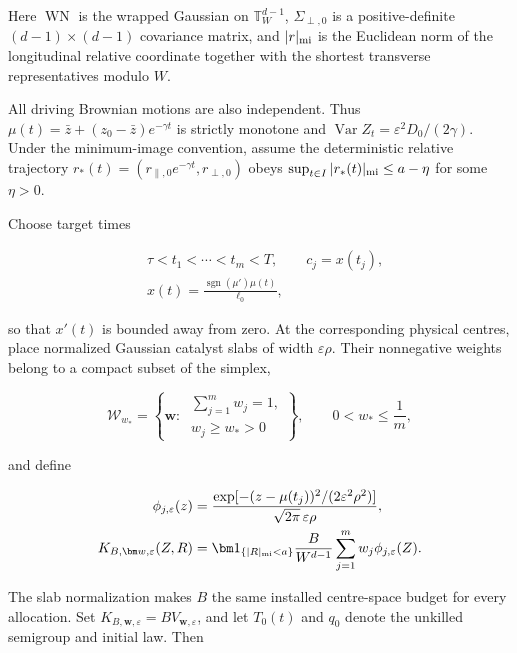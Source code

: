 Here $\operatorname{WN}$ is the wrapped Gaussian on
$\mathbb T_W^{d-1}$, $\Sigma_{\perp,0}$ is a positive-definite
$(d-1)\times(d-1)$ covariance matrix, and $|r|_{\rm mi}$ is the Euclidean norm
of the longitudinal relative coordinate together with the shortest transverse
representatives modulo $W$.

All driving Brownian motions are also independent.  Thus
$\mu(t)=\bar z+(z_0-\bar z)e^{-\gamma t}$ is strictly monotone and
$\operatorname{Var}Z_t=\varepsilon^2D_0/(2\gamma)$.  Under the minimum-image
convention, assume the deterministic relative trajectory
$r_*(t)=(r_{\parallel,0}e^{-\gamma t},r_{\perp,0})$ obeys
$\sup_{t\in I}|r_*(t)|_{\rm mi}\le a-\eta$ for some $\eta>0$.

Choose target times

\begin{equation}
 \begin{aligned}
  &\tau<t_1<\cdots<t_m<T,\qquad c_j=x(t_j),\\
  &x(t)=\frac{\operatorname{sgn}(\mu')\mu(t)}{\ell_0},
 \end{aligned}
 \label{eq:exact-m-centres}
\end{equation}

so that $x'(t)$ is bounded away from zero.  At the corresponding physical
centres, place normalized Gaussian catalyst slabs of width
$\varepsilon\rho$.  Their nonnegative weights belong to a compact subset of
the simplex,

\begin{equation}
 \mathcal W_{w_*}
 =\left\{\bm w:\
   \substack{\sum_{j=1}^{m}w_j=1,\\ w_j\ge w_*>0}\right\},
 \qquad 0<w_*\le\frac1m,
 \label{eq:exact-m-simplex}
\end{equation}

and define

\begin{equation}
 \begin{aligned}
 \phi_{j,\varepsilon}(z)
 &=\frac{\exp[-(z-\mu(t_j))^2/(2\varepsilon^2\rho^2)]}
        {\sqrt{2\pi}\,\varepsilon\rho},\\
 K_{B,\bm w,\varepsilon}(Z,R)
 &=\bm1_{\{|R|_{\rm mi}<a\}}\frac{B}{W^{d-1}}
   \sum_{j=1}^{m}w_j\phi_{j,\varepsilon}(Z).
 \end{aligned}
 \label{eq:exact-m-killing}
\end{equation}

The slab normalization makes $B$ the same installed centre-space budget for
every allocation.  Set $K_{B,\bm w,\varepsilon}=B V_{\bm w,\varepsilon}$,
and let $T_0(t)$ and $q_0$ denote the unkilled semigroup and initial law.  Then

